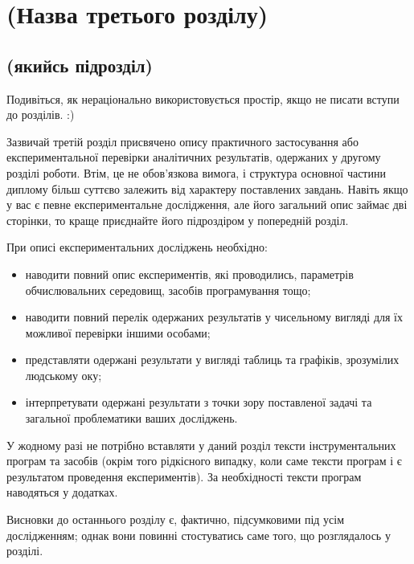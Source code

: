 \chapter{(Назва третього розділу)}
\label{chap:practice}

\section{(якийсь підрозділ)}

Подивіться, як нераціонально використовується простір, якщо не писати 
вступи до розділів. :)

Зазвичай третій розділ присвячено опису практичного застосування або 
експериментальної перевірки аналітичних результатів, одержаних у другому 
розділі роботи. Втім, це не обов'язкова вимога, і структура основної 
частини диплому більш суттєво залежить від характеру поставлених завдань. 
Навіть якщо у вас є певне експериментальне дослідження, але його загальний 
опис займає дві сторінки, то краще приєднайте його підроздіром у 
попередній розділ.

При описі експериментальних досліджень необхідно:

\begin{itemize}
\item наводити повний опис експериментів, які проводились, параметрів 
обчислювальних середовищ, засобів програмування тощо;
\item наводити повний перелік одержаних результатів у чисельному вигляді для їх можливої 
перевірки іншими особами;
\item представляти одержані результати у вигляді таблиць та графіків, 
зрозумілих людському оку;
\item інтерпретувати одержані результати з точки зору поставленої задачі 
та загальної проблематики ваших досліджень.
\end{itemize}

У жодному разі не потрібно вставляти у даний розділ тексти 
інструментальних програм та засобів (окрім того рідкісного випадку, коли 
саме тексти програм і є результатом проведення експериментів). За 
необхідності тексти програм наводяться у додатках.


\chapconclude{\ref{chap:practice}}

Висновки до останнього розділу є, фактично, підсумковими під усім 
дослідженням; однак вони повинні стостуватись саме того, що розглядалось у 
розділі.